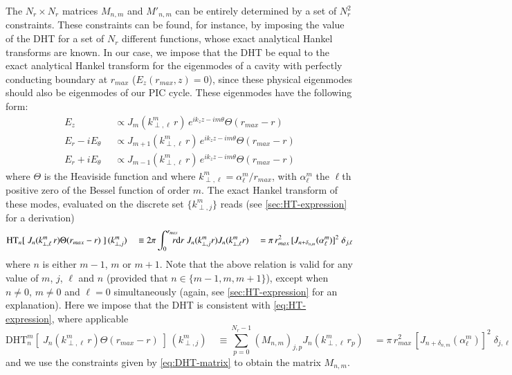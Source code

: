 The $N_r\times N_r$ matrices $M_{n,m}$ and $M'_{n,m}$ can be entirely
determined by a set of $N_r^2$ constraints. These
constraints can be found, for instance, by imposing the value of the
DHT for a set of $N_r$ different functions, whose exact analytical Hankel
transforms are known. In our case, we impose that the DHT be equal to the exact analytical
Hankel transform for the eigenmodes of a cavity with
perfectly conducting boundary at $r_{max}$ ($E_z(r_{max},z) =
0$), since these physical eigenmodes should also be eigenmodes of our
PIC cycle. These eigenmodes have the following form:
\begin{subequations}
\begin{align}
E_z \;& \; \propto  J_m(k^m_{\perp,\ell} \,r)\,e^{ik_z z -im\theta} \Theta(r_{max}-r) \\
E_r -i E_\theta \;& \; \propto  J_{m+1}(k^m_{\perp,\ell} \,r) \,e^{ik_z z -im\theta} \Theta(r_{max}-r)\\
E_r +i E_\theta \;& \; \propto  J_{m-1}(k^m_{\perp,\ell} \,r)
                    \,e^{ik_z z -im\theta} \Theta(r_{max}-r) 
\end{align}
\end{subequations}
where $\Theta$ is the Heaviside function and where $k^m_{\perp,\ell} =
\alpha^m_\ell / r_{max}$, with $\alpha^m_\ell$ the $\ell$th positive zero of
the Bessel function of order $m$. 
The exact Hankel transform of these modes, evaluated on the discrete set
$\{k^m_{\perp,j} \}$ reads (see \ref{sec:HT-expression} for a derivation)
\begin{equation} 
\label{eq:HT-expression}
\mathrm{HT}_{n}[ \; J_n(k^m_{\perp,\ell} \,r)  \Theta(r_{max}-r)  \;] \,(k^m_{\perp,j} )
\quad \equiv 2\pi \int_{0}^{r_{max}} \!\!\!\!\! r\mathrm{d}r \; J_n (k^m_{\perp,j} r) J_n (k^m_{\perp,\ell} r)
\quad = \pi\, r_{max}^2\,[ J_{n+\delta_{n,m}}(\alpha_\ell^m)]^2 \;\delta_{j,\ell} 
\end{equation}
where $n$ is either $m-1$, $m$ or $m+1$. Note that the above relation
is valid for any value of $m$, $j$, $\ell$ and $n$ (provided that $n\in \{m-1,m,m+1\}$), except when $n
\neq 0$, $m \neq 0$ and $\ell = 0$ simultaneously (again, see
\ref{sec:HT-expression} for an explanation). Here we impose that the DHT is consistent with
\cref{eq:HT-expression}, where applicable
\begin{equation}
\label{eq:DHT-matrix}
\mathrm{DHT}^m_{n}[ \; J_n(k^m_{\perp,\ell} \,r) \Theta(r_{max}-r)  \;] \,(k^m_{\perp,j}) 
\quad \equiv \sum_{p=0}^{N_r-1} (M_{n,m})_{j,p}
  J_n(k^m_{\perp,\ell}\,r_p) 
\quad = \pi\, r_{max}^2\,[ J_{n+\delta_{n,m}}(\alpha_\ell^m)]^2 \; \delta_{j,\ell} 
\end{equation}
\noindent and we use the constraints given by \cref{eq:DHT-matrix} to
obtain the matrix $M_{n,m}$.

